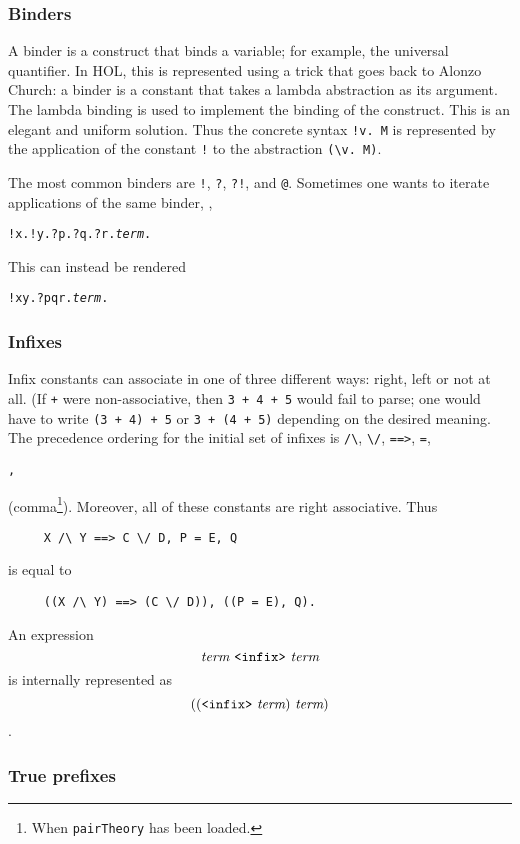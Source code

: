 \documentclass[12pt,fleqn,a4paper]{report}
\newcommand{\term}       {\mbox{\it term}}
\begin{document}
\subsubsection{Binders}

A binder is a construct that binds a variable; for example, the
universal quantifier. In HOL, this is represented using a trick that
goes back to Alonzo Church: a binder is a constant that takes a lambda
abstraction as its argument. The lambda binding is used to implement
the binding of the construct. This is an elegant and uniform solution.
Thus the concrete syntax \verb+!v. M+ is represented by the
application of the constant \verb+!+ to the abstraction \verb+(\v. M)+.

The most common binders are \verb+!+, \verb+?+, \verb+?!+, and
\verb+@+. Sometimes one wants to iterate applications of the same
binder, \eg,
\begin{alltt}
  !x. !y. ?p. ?q. ?r. \term.
\end{alltt}
This can instead be rendered
\begin{alltt}
  !x y. ?p q r. \term.
\end{alltt}

\subsubsection{Infixes}

Infix constants can associate in one of three different ways: right,
left or not at all.  (If \verb-+- were non-associative, then {\tt 3 +
  4 + 5} would fail to parse; one would have to write {\tt (3 + 4) +
  5} or {\tt 3 + (4 + 5)} depending on the desired meaning.  The
precedence ordering for the initial set of infixes is \verb+/\+,
\verb+\/+, \verb+==>+, \verb+=+,
 \begin{Large}\verb+,+\end{Large} (comma\footnote{When {\tt pairTheory} has
   been loaded.}). Moreover, all of these constants are right
 associative. Thus
\begin{verbatim}
     X /\ Y ==> C \/ D, P = E, Q
\end{verbatim}
 is equal to
\begin{verbatim}
     ((X /\ Y) ==> (C \/ D)), ((P = E), Q).
\end{verbatim}

\noindent An expression \[\term\ \verb+<infix>+\ \term\] is internally
represented as \[((\verb+<infix>+\ \term)\ \term)\].

\subsubsection{True prefixes}
\end{document}
